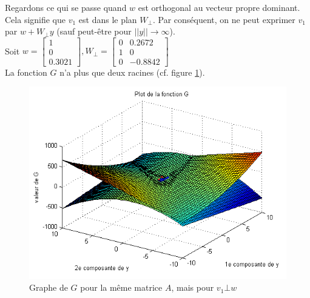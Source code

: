 Regardons ce qui se passe quand $w$ est orthogonal au vecteur propre dominant. Cela signifie que $v_1$ est dans le plan $W_\bot$. Par conséquent, on ne peut exprimer $v_1$ par $w+W_{\bot}y$ (sauf peut-être pour $||y|| \rightarrow \infty$). \\
Soit $w = 
\begin{bmatrix}
1 \\
0\\
0.3021
\end{bmatrix} , 
W_{\bot} =  
\begin{bmatrix}
0 & 0.2672 \\
1 & 0 \\
0 & -0.8842 
\end{bmatrix}$\\
La fonction $G$ n'a plus que deux racines (cf. figure \ref{FigNewtonv1inW}).

\begin{figure}
\centering
\includegraphics[width=12cm]{grapheG3.png}
\caption{Graphe de $G$ pour la même matrice $A$, mais pour $v_1 \bot w$  
}
\label{FigNewtonv1inW}
\end{figure}


